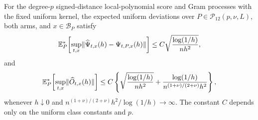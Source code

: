 For the degree-\(p\) signed-distance local-polynomial score and Gram processes with the fixed uniform kernel, the expected uniform deviations over \(P\in\mathcal P_{12}(p,\nu,L)\), both arms, and \(x\in\mathcal B_P\) satisfy
\[
 \mathbb E_P^*\!\left[\sup_{t,x}\lVert\widehat\Psi_{t,x}(h)-\Psi_{t,P,x}(h)\rVert\right]
 \leq C\sqrt{{\log(1/h)\over nh^2}},
\]
and
\[
 \mathbb E_P^*\!\left[\sup_{t,x}\lVert\widehat O_{t,x}(h)\rVert\right]
 \leq C\left\{
 \sqrt{{\log(1/h)\over nh^2}}
 +{\log(1/h)\over n^{(1+\nu)/(2+\nu)}h^2}
 \right\},
\]
whenever \(h\downarrow0\) and \(n^{(1+\nu)/(2+\nu)}h^2/\log(1/h)\to\infty\).  The constant \(C\) depends only on the uniform class constants and \(p\).